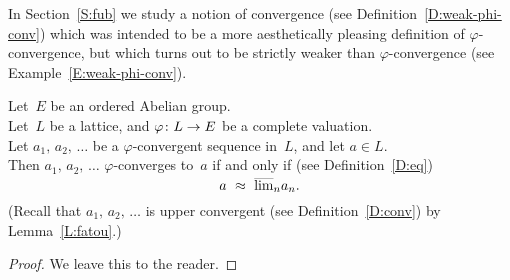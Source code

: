 \documentclass[main.tex]{subfiles}
\begin{document}
In Section~\ref{S:fub} we study a notion of convergence
(see Definition~\ref{D:weak-phi-conv})
which was intended to be a more aesthetically pleasing
definition of $\varphi$-convergence,
but which turns out to be strictly weaker 
than $\varphi$-convergence
(see Example~\ref{E:weak-phi-conv}).
%
%
\begin{prop}
\label{P:seq-phi-conv-to}
Let~$E$ be an ordered Abelian group.\\
Let~$L$ be a lattice, and $\varphi\colon L \rightarrow E$ be a complete valuation.\\
Let $a_1,\,a_2,\,\dotsc$ be a $\varphi$-convergent sequence in~$L$,
and let $a\in L$.\\
Then $a_1,\,a_2,\,\dotsc$
$\varphi$-converges to~$a$
if and only if (see Definition~\ref{D:eq})
\begin{equation*}
a\ \approx\ \ulim{n}a_n.
\end{equation*}
(Recall that
$a_1,\,a_2,\,\dotsc$
is upper convergent
(see Definition~\ref{D:conv})
by Lemma~\ref{L:fatou}.)
\end{prop}
\begin{proof}
We leave this to the reader.
\end{proof}
\end{document}
